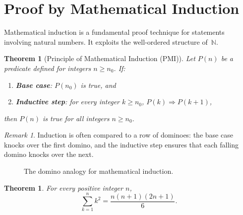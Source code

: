 \documentclass[12pt,a4paper,openany]{book}
\theoremstyle{definition}
\theoremstyle{plain}
\newtheorem{theorem}[definition]{Theorem}
\theoremstyle{remark}
\newtheorem{remark}[definition]{Remark}
\newcommand{\N}{\mathbb{N}}
\begin{document}
\section{Proof by Mathematical Induction}
\label{sec:induction}

Mathematical induction is a fundamental proof technique for statements involving
natural numbers. It exploits the well-ordered structure of~$\N$.

\begin{theorem}[Principle of Mathematical Induction (PMI)]
\label{thm:pmi}
Let $P(n)$ be a predicate defined for integers $n \geq n_0$. If:
\begin{enumerate}[nosep]
  \item \textbf{Base case}: $P(n_0)$ is true, and
  \item \textbf{Inductive step}: for every integer $k \geq n_0$,
        $P(k) \Rightarrow P(k+1)$,
\end{enumerate}
then $P(n)$ is true for all integers $n \geq n_0$.
\end{theorem}

\begin{remark}
\label{rem:induction-analogy}
Induction is often compared to a row of dominoes: the base case knocks over the first
domino, and the inductive step ensures that each falling domino knocks over the next.
\end{remark}

\begin{figure}[ht]
\centering
{}
\caption{The domino analogy for mathematical induction.}
\label{fig:induction-dominoes}
\end{figure}

\begin{theorem}
\label{thm:sum-squares}
For every positive integer $n$,
\[
  \sum_{k=1}^{n} k^2 = \frac{n(n+1)(2n+1)}{6}.
\]
\end{theorem}
\end{document}
